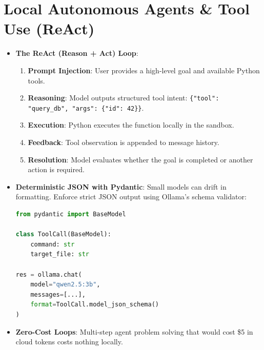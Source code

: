 \documentclass[11pt,a4paper]{article}
\begin{document}
\section{Local Autonomous Agents \& Tool Use (ReAct)}
\begin{itemize}
    \item \textbf{The ReAct (Reason + Act) Loop}:
    \begin{enumerate}
        \item \textbf{Prompt Injection}: User provides a high-level goal and available Python tools.
        \item \textbf{Reasoning}: Model outputs structured tool intent: \texttt{\{"tool": "query\_db", "args": \{"id": 42\}\}}.
        \item \textbf{Execution}: Python executes the function locally in the sandbox.
        \item \textbf{Feedback}: Tool observation is appended to message history.
        \item \textbf{Resolution}: Model evaluates whether the goal is completed or another action is required.
    \end{enumerate}
    \item \textbf{Deterministic JSON with Pydantic}: Small models can drift in formatting. Enforce strict JSON output using Ollama's schema validator:
\begin{lstlisting}[language=Python]
from pydantic import BaseModel

class ToolCall(BaseModel):
    command: str
    target_file: str

res = ollama.chat(
    model="qwen2.5:3b",
    messages=[...],
    format=ToolCall.model_json_schema()
)
\end{lstlisting}
    \item \textbf{Zero-Cost Loops}: Multi-step agent problem solving that would cost \$5 in cloud tokens costs nothing locally.
\end{itemize}

\end{document}
